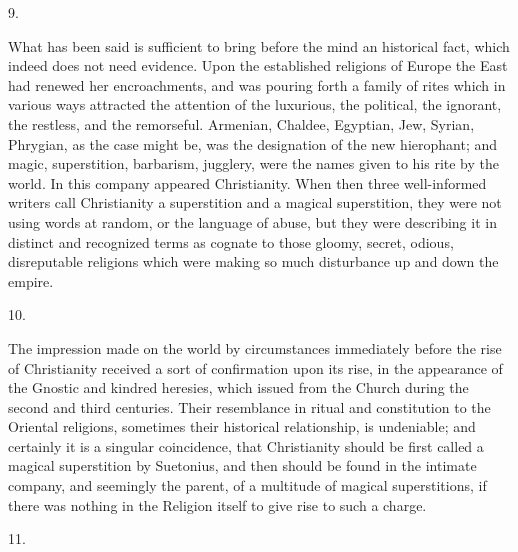 9.

What has been said is sufficient to bring before the
mind an historical fact, which indeed does not need
evidence. Upon the established religions of Europe the
East had renewed her encroachments, and was pouring forth
a family of rites which in various ways attracted the
attention of the luxurious, the political, the ignorant,
the restless, and the remorseful. Armenian, Chaldee,
Egyptian, Jew, Syrian, Phrygian, as the case might be,
was the designation of the new hierophant; and magic,
superstition, barbarism, jugglery, were the names given
to his rite by the world. In this company appeared Christianity. When then three well-informed writers call
Christianity a superstition and a magical superstition,
they were not using words at random, or the language of
abuse, but they were describing it in distinct and
recognized terms as cognate to those gloomy, secret,
odious, disreputable religions which were making so much
disturbance up and down the empire.

10.

The impression made on the world by circumstances
immediately before the rise of Christianity received a
sort of confirmation upon its rise, in the appearance of
the Gnostic and kindred heresies, which issued from the
Church during the second and third centuries. Their
resemblance in ritual and constitution to the Oriental
religions, sometimes their historical relationship, is
undeniable; and certainly it is a singular coincidence,
that Christianity should be first called a magical
superstition by Suetonius, and then should be found in
the intimate company, and seemingly the parent, of a
multitude of magical superstitions, if there was nothing
in the Religion itself to give rise to such a charge.

11.

